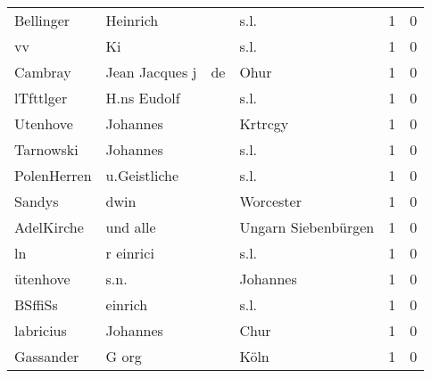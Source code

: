 \begin{center}
\begin{tiny}
\begin{longtabu}{llllrr}
                Bellinger &                           Heinrich &             &                                        s.l. &          1 &         0 \\
                       vv &                                 Ki &             &                                        s.l. &          1 &         0 \\
                  Cambray &                     Jean Jacques j &          de &                                        Ohur &          1 &         0 \\
                lTfttlger &                        H.ns Eudolf &             &                                        s.l. &          1 &         0 \\
                 Utenhove &                           Johannes &             &                                     Krtrcgy &          1 &         0 \\
                Tarnowski &                           Johannes &             &                                        s.l. &          1 &         0 \\
              PolenHerren &                       u.Geistliche &             &                                        s.l. &          1 &         0 \\
                   Sandys &                               dwin &             &                                   Worcester &          1 &         0 \\
               AdelKirche &                           und alle &             &                         Ungarn Siebenbürgen &          1 &         0 \\
                       ln &                          r einrici &             &                                        s.l. &          1 &         0 \\
                 ütenhove &                               s.n. &             &                                    Johannes &          1 &         0 \\
                  BSffiSs &                            einrich &             &                                        s.l. &          1 &         0 \\
                labricius &                           Johannes &             &                                        Chur &          1 &         0 \\
                Gassander &                              G org &             &                                        Köln &          1 &         0 \\

\end{longtabu}
\end{tiny}
\end{center}
